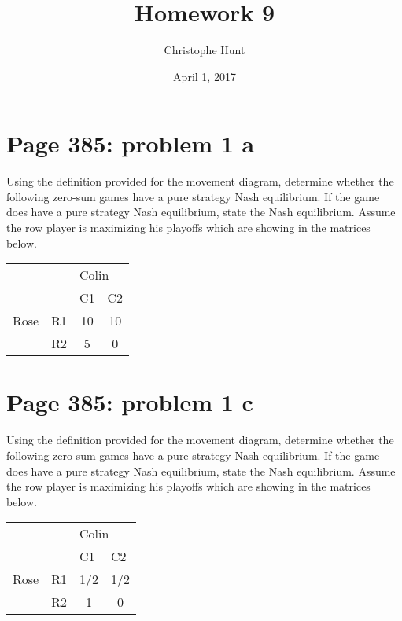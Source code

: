 \documentclass[]{article}
\title{Homework 9}
\author{Christophe Hunt}
\date{April 1, 2017}
\begin{document}
\maketitle

{
\setcounter{tocdepth}{2}
\tableofcontents
}
\newpage

\section{Page 385: problem 1 a}\label{page-385-problem-1-a}

Using the definition provided for the movement diagram, determine
whether the following zero-sum games have a pure strategy Nash
equilibrium. If the game does have a pure strategy Nash equilibrium,
state the Nash equilibrium. Assume the row player is maximizing his
playoffs which are showing in the matrices below.

\begin{table}[!h]
\centering
\begin{tabular}{lllc}
 &  & \multicolumn{2}{l}{Colin} \\ \cline{3-4}
 &  & C1 & \multicolumn{1}{l}{C2} \\ \hline
Rose & R1 & \multicolumn{1}{c}{10} & 10 \\
 & R2 & \multicolumn{1}{c}{5} & 0 \\ \hline
\end{tabular}
\end{table}

\section{Page 385: problem 1 c}\label{page-385-problem-1-c}

Using the definition provided for the movement diagram, determine
whether the following zero-sum games have a pure strategy Nash
equilibrium. If the game does have a pure strategy Nash equilibrium,
state the Nash equilibrium. Assume the row player is maximizing his
playoffs which are showing in the matrices below.

\begin{table}[!h]
\centering
\begin{tabular}{lllc}
 &  & \multicolumn{2}{l}{Colin} \\ \cline{3-4}
 &  & C1 & \multicolumn{1}{l}{C2} \\ \hline
Rose & R1 & \multicolumn{1}{c}{1/2} & 1/2 \\
 & R2 & \multicolumn{1}{c}{1} & 0 \\ \hline
\end{tabular}
\end{table}
\end{document}
